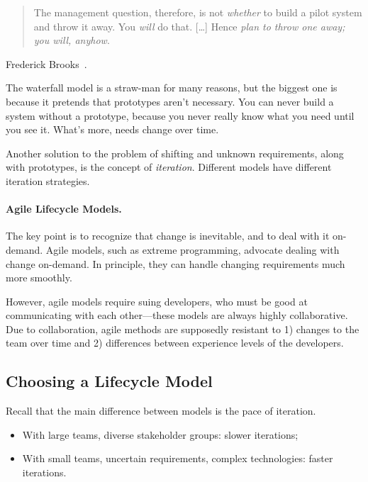 \begin{quote}
The management question, therefore, is not {\em whether} to build a pilot system and throw it away. You {\em will} do that. [\ldots] Hence {\em plan to throw one away; you will, anyhow}.
\end{quote}
\hfill Frederick Brooks~\cite{mmm}.

The waterfall model is a straw-man for many reasons, but the
biggest one is because it pretends that prototypes aren't necessary.
You can never build a system without a prototype, because you never
really know what you need until you see it.  What's more, needs change
over time.

Another solution to the problem of shifting and unknown requirements,
along with prototypes, is the concept of \emph{iteration}. Different
models have different iteration strategies.

\paragraph{Agile Lifecycle Models.} The key point is to recognize
that change is inevitable, and to deal with it on-demand. Agile
models, such as extreme programming, advocate dealing with change
on-demand. In principle, they can handle changing requirements much
more smoothly.

However, agile models require suing developers, who must be good at
communicating with each other---these models are always highly
collaborative. Due to collaboration, agile methods are
supposedly resistant to 1) changes to the team over time and
2) differences between experience levels of the developers.

\subsection*{Choosing a Lifecycle Model}
Recall that the main difference between models is the pace of iteration.
\begin{itemize}
\item With large teams, diverse stakeholder groups: slower iterations;
\item With small teams, uncertain requirements, complex technologies: faster iterations.
\end{itemize}


